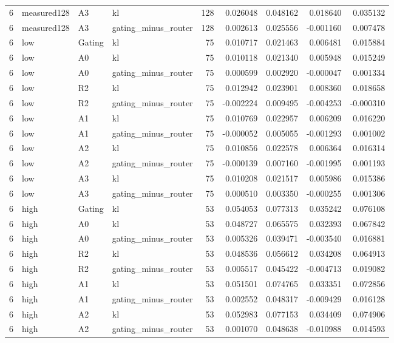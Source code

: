 \begin{tabular}{rlllrrrrr}
6 & measured128 & A3 & kl & 128 & 0.026048 & 0.048162 & 0.018640 & 0.035132 \\
6 & measured128 & A3 & gating_minus_router & 128 & 0.002613 & 0.025556 & -0.001160 & 0.007478 \\
6 & low & Gating & kl & 75 & 0.010717 & 0.021463 & 0.006481 & 0.015884 \\
6 & low & A0 & kl & 75 & 0.010118 & 0.021340 & 0.005948 & 0.015249 \\
6 & low & A0 & gating_minus_router & 75 & 0.000599 & 0.002920 & -0.000047 & 0.001334 \\
6 & low & R2 & kl & 75 & 0.012942 & 0.023901 & 0.008360 & 0.018658 \\
6 & low & R2 & gating_minus_router & 75 & -0.002224 & 0.009495 & -0.004253 & -0.000310 \\
6 & low & A1 & kl & 75 & 0.010769 & 0.022957 & 0.006209 & 0.016220 \\
6 & low & A1 & gating_minus_router & 75 & -0.000052 & 0.005055 & -0.001293 & 0.001002 \\
6 & low & A2 & kl & 75 & 0.010856 & 0.022578 & 0.006364 & 0.016314 \\
6 & low & A2 & gating_minus_router & 75 & -0.000139 & 0.007160 & -0.001995 & 0.001193 \\
6 & low & A3 & kl & 75 & 0.010208 & 0.021517 & 0.005986 & 0.015386 \\
6 & low & A3 & gating_minus_router & 75 & 0.000510 & 0.003350 & -0.000255 & 0.001306 \\
6 & high & Gating & kl & 53 & 0.054053 & 0.077313 & 0.035242 & 0.076108 \\
6 & high & A0 & kl & 53 & 0.048727 & 0.065575 & 0.032393 & 0.067842 \\
6 & high & A0 & gating_minus_router & 53 & 0.005326 & 0.039471 & -0.003540 & 0.016881 \\
6 & high & R2 & kl & 53 & 0.048536 & 0.056612 & 0.034208 & 0.064913 \\
6 & high & R2 & gating_minus_router & 53 & 0.005517 & 0.045422 & -0.004713 & 0.019082 \\
6 & high & A1 & kl & 53 & 0.051501 & 0.074765 & 0.033351 & 0.072856 \\
6 & high & A1 & gating_minus_router & 53 & 0.002552 & 0.048317 & -0.009429 & 0.016128 \\
6 & high & A2 & kl & 53 & 0.052983 & 0.077153 & 0.034409 & 0.074906 \\
6 & high & A2 & gating_minus_router & 53 & 0.001070 & 0.048638 & -0.010988 & 0.014593 \\

\end{tabular}
